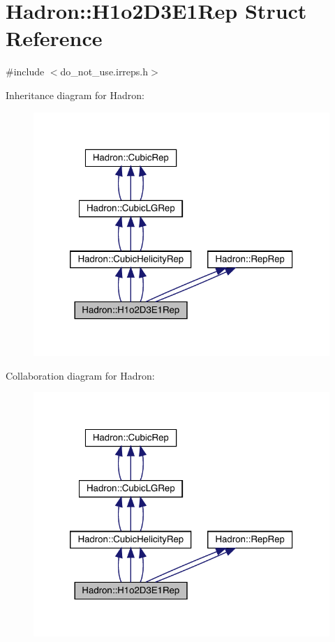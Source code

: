 \hypertarget{structHadron_1_1H1o2D3E1Rep}{}\section{Hadron\+:\+:H1o2\+D3\+E1\+Rep Struct Reference}
\label{structHadron_1_1H1o2D3E1Rep}


{\ttfamily \#include $<$do\+\_\+not\+\_\+use.\+irreps.\+h$>$}



Inheritance diagram for Hadron\+:
\nopagebreak
\begin{figure}[H]
\begin{center}
\leavevmode
\includegraphics[width=320pt]{d5/d50/structHadron_1_1H1o2D3E1Rep__inherit__graph}
\end{center}
\end{figure}


Collaboration diagram for Hadron\+:
\nopagebreak
\begin{figure}[H]
\begin{center}
\leavevmode
\includegraphics[width=320pt]{df/da8/structHadron_1_1H1o2D3E1Rep__coll__graph}
\end{center}
\end{figure}
